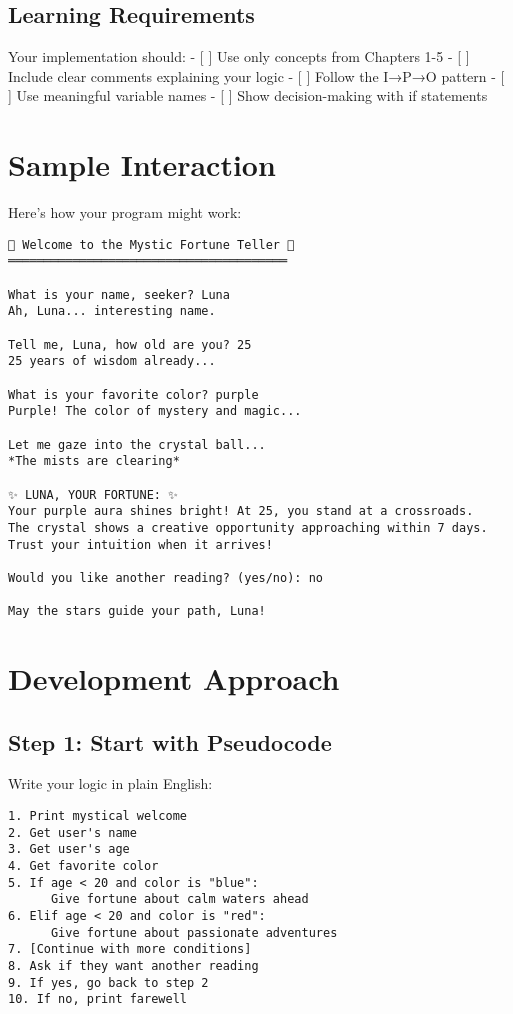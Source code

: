 \documentclass[
  letterpaper,
  DIV=11,
  numbers=noendperiod,
  oneside]{scrreprt}
\begin{document}
\subsection{Learning Requirements}\label{learning-requirements}

Your implementation should: - {[} {]} Use only concepts from Chapters
1-5 - {[} {]} Include clear comments explaining your logic - {[} {]}
Follow the I→P→O pattern - {[} {]} Use meaningful variable names - {[}
{]} Show decision-making with if statements

\section{Sample Interaction}\label{sample-interaction}

Here's how your program might work:

\begin{verbatim}
🔮 Welcome to the Mystic Fortune Teller 🔮
═══════════════════════════════════════

What is your name, seeker? Luna
Ah, Luna... interesting name.

Tell me, Luna, how old are you? 25
25 years of wisdom already...

What is your favorite color? purple
Purple! The color of mystery and magic...

Let me gaze into the crystal ball...
*The mists are clearing*

✨ LUNA, YOUR FORTUNE: ✨
Your purple aura shines bright! At 25, you stand at a crossroads.
The crystal shows a creative opportunity approaching within 7 days.
Trust your intuition when it arrives!

Would you like another reading? (yes/no): no

May the stars guide your path, Luna!
\end{verbatim}

\section{Development Approach}\label{development-approach}

\subsection{Step 1: Start with
Pseudocode}\label{step-1-start-with-pseudocode}

Write your logic in plain English:

\begin{verbatim}
1. Print mystical welcome
2. Get user's name
3. Get user's age
4. Get favorite color
5. If age < 20 and color is "blue":
      Give fortune about calm waters ahead
6. Elif age < 20 and color is "red":
      Give fortune about passionate adventures
7. [Continue with more conditions]
8. Ask if they want another reading
9. If yes, go back to step 2
10. If no, print farewell
\end{verbatim}
\end{document}
